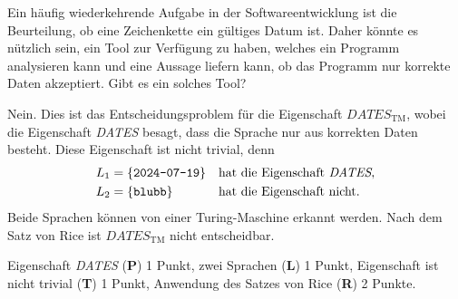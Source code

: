 Ein häufig wiederkehrende Aufgabe in der Softwareentwicklung ist die
Beurteilung, ob eine Zeichenkette ein gültiges Datum ist.
Daher könnte es nützlich sein, ein Tool zur Verfügung zu haben,
welches ein Programm analysieren kann und eine Aussage liefern kann,
ob das Programm nur korrekte Daten akzeptiert.
Gibt es ein solches Tool?


\begin{loesung}
Nein.
Dies ist das Entscheidungsproblem für die Eigenschaft
$\textit{DATES}_{\text{TM}}$, wobei die Eigenschaft \textit{DATES}
besagt, dass die Sprache nur aus korrekten Daten besteht.
Diese Eigenschaft ist nicht trivial, denn 
\[
\begin{aligned}
L_1&=\{\texttt{2024-07-19}\}&&\text{hat die Eigenschaft \textit{DATES},}\\
L_2&=\{\texttt{blubb}\}&&\text{hat die Eigenschaft nicht.}
\end{aligned}
\]
Beide Sprachen können von einer Turing-Maschine erkannt werden.
Nach dem Satz von Rice ist $\textit{DATES}_{\text{TM}}$ nicht
entscheidbar.
\end{loesung}

\begin{bewertung}
Eigenschaft \textit{DATES} ({\bf P}) 1 Punkt,
zwei Sprachen ({\bf L}) 1 Punkt,
Eigenschaft ist nicht trivial ({\bf T}) 1 Punkt,
Anwendung des Satzes von Rice ({\bf R}) 2 Punkte.
\end{bewertung}


